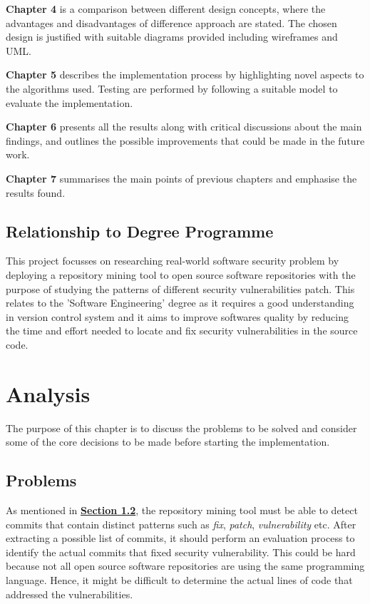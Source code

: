\documentclass[12pt, a4paper]{report}
\begin{document}
\noindent\textbf{Chapter 4} is a comparison between different design concepts, where the advantages
and disadvantages of difference approach are stated. The chosen design is justified with suitable
diagrams provided including wireframes and UML.

\noindent\textbf{Chapter 5} describes the implementation process by highlighting novel aspects to
the algorithms used. Testing are performed by following a suitable model to evaluate the
implementation.

\noindent\textbf{Chapter 6} presents all the results along with critical discussions about the main
findings,	and outlines the possible improvements that could be made in the future work.

\noindent\textbf{Chapter 7} summarises the main points of previous chapters and emphasise the
results found.

\section{Relationship to Degree Programme}
This project focusses on researching real-world software security problem by deploying a repository
mining tool to open source software repositories with the purpose of studying the patterns of
different security vulnerabilities patch. This relates to the 'Software Engineering' degree as it
requires a good understanding in version control system and it aims to improve softwares quality by
reducing the time and effort needed to locate and fix security vulnerabilities in the source code.

\chapter{Analysis} %
The purpose of this chapter is to discuss the problems to be solved and consider some of the core
decisions to be made before starting the implementation.

\section{Problems}
As mentioned in \hyperref[sec:objectives]{\textbf{Section 1.2}}, the repository mining tool must be
able to detect commits that contain distinct patterns such as \textit{fix}, \textit{patch},
\textit{vulnerability} etc. After extracting a possible list of commits, it should perform an
evaluation process to identify the actual commits that fixed security vulnerability.	This could be
hard because not all open source software repositories are using the same programming language.
Hence, it might be difficult to determine the actual lines of code that addressed the
vulnerabilities.
\end{document}
